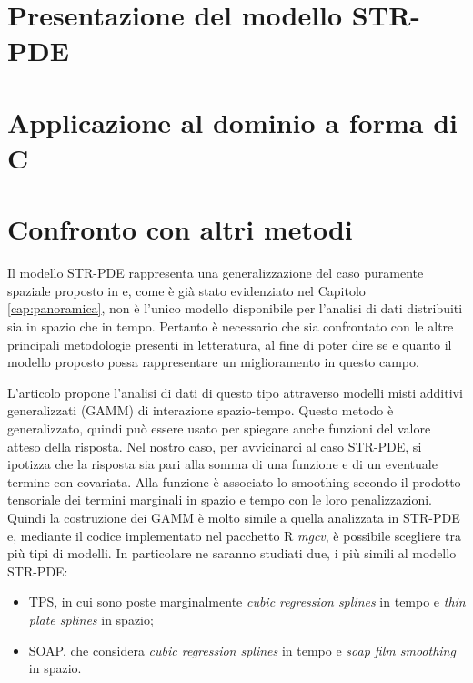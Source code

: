 \documentclass[a4paper,11pt,twoside,openright]{book}							%
\begin{document}
\chapter{Presentazione del modello STR-PDE}
\label{cap:modello}

\chapter{Applicazione al dominio a forma di C}
\label{cap:domC}

\chapter{Confronto con altri metodi}
\label{cap:confronto}

Il modello STR-PDE rappresenta una generalizzazione del caso puramente spaziale proposto in \cite{art:sangalli} e, come è già stato evidenziato nel Capitolo \ref{cap:panoramica}, non è l'unico modello disponibile per l'analisi di dati distribuiti sia in spazio che in tempo. Pertanto è necessario che sia confrontato con le altre principali metodologie presenti in letteratura, al fine di poter dire se e quanto il modello proposto possa rappresentare un miglioramento in questo campo.

L'articolo \cite{art:augustin} propone l'analisi di dati di questo tipo attraverso modelli misti additivi generalizzati (GAMM) di interazione spazio-tempo. Questo metodo è generalizzato, quindi può essere usato per spiegare anche funzioni del valore atteso della risposta. Nel nostro caso, per avvicinarci al caso STR-PDE, si ipotizza che la risposta sia pari alla somma di una funzione e di un eventuale termine con covariata. Alla funzione è associato lo smoothing secondo il prodotto tensoriale dei termini marginali in spazio e tempo con le loro penalizzazioni. Quindi la costruzione dei GAMM è molto simile a quella analizzata in STR-PDE e, mediante il codice implementato nel pacchetto R \textit{mgcv}, è possibile scegliere tra più tipi di modelli. In particolare ne saranno studiati due, i più simili al modello STR-PDE:
\begin{itemize}
\item TPS, in cui sono poste marginalmente \textit{cubic regression splines} in tempo e \textit{thin plate splines} in spazio;
\item SOAP, che considera \textit{cubic regression splines} in tempo e \textit{soap film smoothing} in spazio.
\end{itemize}
\end{document}
